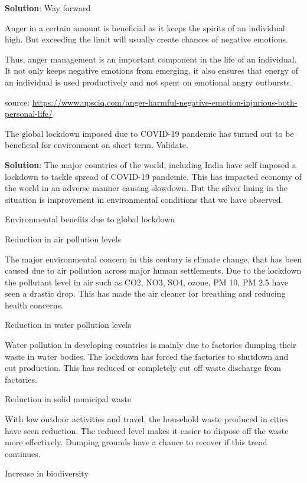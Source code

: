 \documentclass[
  openany]{book}
\newcommand{\question}{\item}
\newenvironment{solution}{ {\bfseries Solution}:}{}
\begin{document}
\begin{questions}
\begin{solution}
Way forward

Anger in a certain amount is beneficial as it keeps the spirits of an individual high. But exceeding the limit will usually create chances of negative emotions.

Thus, anger management is an important component in the life of an individual. It not only keeps negative emotions from emerging, it also ensures that energy of an individual is used productively and  not spent on emotional angry outbursts.

source: \url{https://www.upsciq.com/anger-harmful-negative-emotion-injurious-both-personal-life/}
\end{solution}

\question The global lockdown imposed due to COVID-19 pandemic has turned out to be beneficial for environment on short term. Validate.

\begin{solution}
The major countries of the world, including India have self imposed a lockdown to tackle spread of COVID-19 pandemic. This has impacted economy of the world in an adverse manner causing slowdown. But the silver lining in the situation is improvement in environmental conditions that we have observed.

Environmental benefits due to global lockdown

Reduction in air pollution levels

The major environmental concern in this century is climate change, that has been caused due to air pollution across major human settlements. Due to the lockdown the pollutant level in air such as CO2, NO3, SO4, ozone, PM 10, PM 2.5 have seen a drastic drop. This has made the air cleaner for breathing and reducing health concerns.

Reduction in water pollution levels

Water pollution in developing countries is mainly due to factories dumping their waste in water bodies. The lockdown has forced the factories to shutdown and cut production. This has reduced or completely cut off waste discharge from factories.

Reduction in solid municipal waste

With low outdoor activities and travel, the household waste produced in cities have seen reduction. The reduced level makes it easier to dispose off the waste more effectively. Dumping grounds have a chance to recover if this trend continues.

Increase in biodiversity


\end{solution}
\end{questions}
\end{document}
